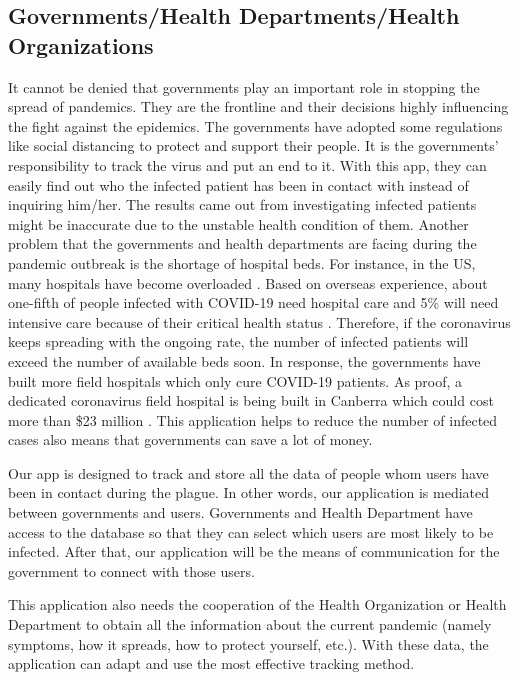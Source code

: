   \subsection{Governments/Health Departments/Health Organizations}
  \par It cannot be denied that governments play an important role in stopping the spread of pandemics. They are the frontline and their decisions highly influencing the fight against the epidemics. The governments have adopted some regulations like social distancing to protect and support their people. It is the governments’ responsibility to track the virus and put an end to it. With this app, they can easily find out who the infected patient has been in contact with instead of inquiring him/her. The results came out from investigating infected patients might be inaccurate due to the unstable health condition of them. Another problem that the governments and health departments are facing during the pandemic outbreak is the shortage of hospital beds. For instance, in the US, many hospitals have become overloaded \parencite{Stake6}. Based on overseas experience, about one-fifth of people infected with COVID-19 need hospital care and 5\% will need intensive care because of their critical health status \parencite{Stake3}. Therefore, if the coronavirus keeps spreading with the ongoing rate, the number of infected patients will exceed the number of available beds soon. In response, the governments have built more field hospitals which only cure COVID-19 patients. As proof, a dedicated coronavirus field hospital is being built in Canberra which could cost more than \$23 million \parencite{Stake7}. This application helps to reduce the number of infected cases also means that governments can save a lot of money.
  \par Our app is designed to track and store all the data of people whom users have been in contact during the plague. In other words, our application is mediated between governments and users. Governments and Health Department have access to the database so that they can select which users are most likely to be infected. After that, our application will be the means of communication for the government to connect with those users.
  \par This application also needs the cooperation of the Health Organization or Health Department to obtain all the information about the current pandemic (namely symptoms, how it spreads, how to protect yourself, etc.). With these data, the application can adapt and use the most effective tracking method.


